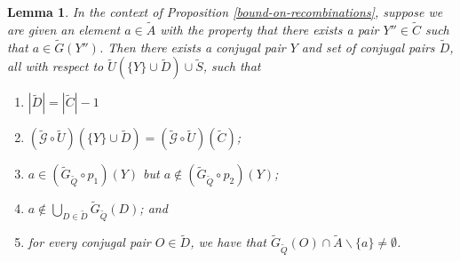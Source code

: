 \documentclass{amsbook}
\theoremstyle{plain}
\newtheorem{lemma}{Lemma}
\theoremstyle{definition}
\theoremstyle{remark}
\newcommand{\set}{\tilde}
\newcommand{\genfun}{\tilde{\mathcal{G}}}
\newcommand{\paren}[1]{\left(#1\right)}
\begin{document}
\begin{lemma}
\label{directed-gaussian-elimination-of-logicals}
In the context of Proposition \ref{bound-on-recombinations}, suppose we are given an element $a\in \set A$ with the property that there exists a pair $Y''\in\set C$ such that $a\in\set G(Y'')$. Then there exists a conjugal pair $Y$ and set of conjugal pairs $\set D$, all with respect to $\set U\paren{\{Y\}\cup \set D} \cup \set S$, such that
\begin{enumerate}
\item $|\set D| = |\set C|-1$
\item $(\genfun\circ\set U)(\{Y\}\cup \set D)=(\genfun\circ\set U)(\set C)$;
\item $a\in (\set G_{\set Q}\circ p_1)(Y)$ but $a\notin (\set G_{\set Q}\circ p_2)(Y)$;
\item $a\notin \bigcup_{D\in \set D} \set G_{\set Q}(D)$; and
\item for every conjugal pair $O\in\set D$, we have that $\set G_{\set Q}(O) \cap \set A\backslash \{a\} \ne \emptyset$.
\end{enumerate}
\end{lemma}
\end{document}
